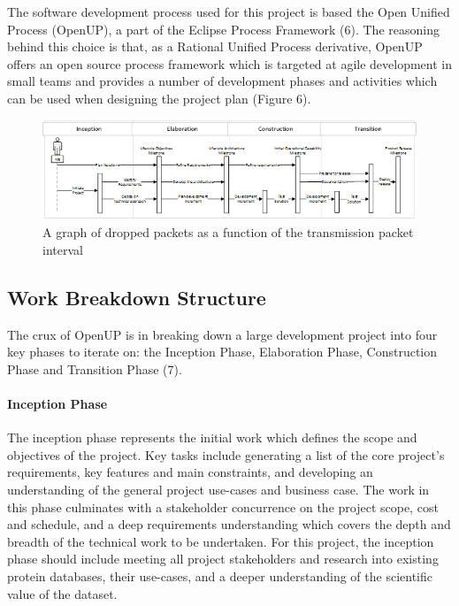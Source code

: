 \documentclass[12pt,a4paper]{article}
\begin{document}
The software development process used for this project is based the Open Unified
Process (OpenUP), a part of the Eclipse Process Framework (6). The reasoning
behind this choice is that, as a Rational Unified Process derivative, OpenUP
offers an open source process framework which is targeted at agile development
in small teams and provides a number of development phases and activities which
can be used when designing the project plan (Figure 6).

\begin{figure}[H]
\centering
\includegraphics{assets/sequence-openup.png}
\caption{A graph of dropped packets as a function of the transmission packet
  interval}
\label{fig:graph-interval-dropped}
\end{figure}

\subsection{Work Breakdown Structure}
The crux of OpenUP is in breaking down a large development project into four key
phases to iterate on: the Inception Phase, Elaboration Phase, Construction Phase
and Transition Phase (7).

\paragraph{Inception Phase} The inception phase represents the initial work
which defines the scope and objectives of the project. Key tasks include
generating a list of the core project's requirements, key features and main
constraints, and developing an understanding of the general project use-cases
and business case. The work in this phase culminates with a stakeholder
concurrence on the project scope, cost and schedule, and a deep requirements
understanding which covers the depth and breadth of the technical work to be
undertaken. For this project, the inception phase should include meeting all
project stakeholders and research into existing protein databases, their
use-cases, and a deeper understanding of the scientific value of the dataset.
\end{document}
